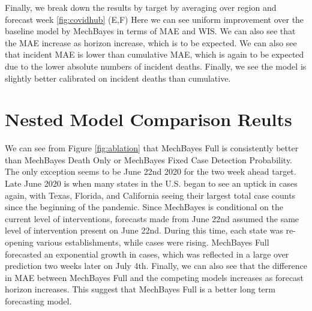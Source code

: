 \documentclass[11pt]{amsart}
\begin{document}
Finally, we break down the results by target by averaging over region and forecast week  \ref{fig:covidhub} (E,F) Here we can see uniform improvement over the baseline model by MechBayes in terms of MAE and WIS. We can also see that the MAE increase as horizon increase, which is to be expected. We can also see that incident MAE is lower than cumulative MAE, which is again to be expected due to the lower absolute numbers of incident deaths. Finally, we see the model is slightly better calibrated on incident deaths than cumulative.
%
%   
   
   
   \section{Nested Model Comparison Reults}

We can see from Figure \ref{fig:ablation} that MechBayes Full is consistently better than MechBayes Death Only or MechBayes Fixed Case Detection Probability. The only exception seems to be June 22nd 2020 for the two week ahead target. Late June 2020 is when many states in the U.S. began to see an uptick in cases again, with Texas, Florida, and California seeing their largest total case counts since the beginning of the pandemic. Since MechBayes is conditional on the current level of interventions, forecasts made from June 22nd assumed the same level of intervention present on June 22nd. During this time, each state was re-opening various establishments, while cases were rising. MechBayes Full forecasted an exponential growth in cases, which was reflected in a large over prediction two weeks later on July 4th. Finally, we can also see that the difference in MAE between MechBayes Full and the competing models increases as forecast horizon increases. This suggest that MechBayes Full is a better long term forecasting model.
\end{document}
